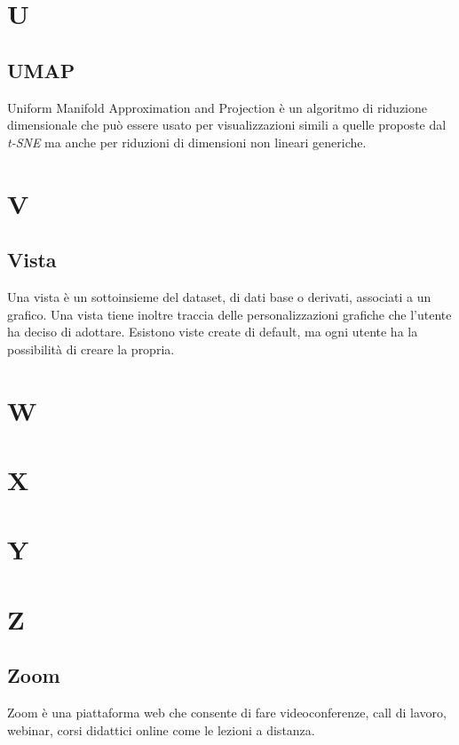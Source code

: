 \section{U}
\subsection{UMAP}
Uniform Manifold Approximation and Projection è un algoritmo di riduzione dimensionale che può essere usato per visualizzazioni simili a quelle proposte dal \textit{t-SNE} ma anche per  riduzioni di dimensioni non lineari generiche.

\newpage
\section{V}
\subsection{Vista}
Una vista è un sottoinsieme del dataset, di dati base o derivati, associati a un grafico. Una vista tiene inoltre traccia delle personalizzazioni grafiche che l'utente ha deciso di adottare. Esistono viste create di default, ma ogni utente ha la possibilità di creare la propria.

\newpage
\section{W}

\newpage
\section{X}

\newpage
\section{Y}

\newpage
\section{Z}
\subsection{Zoom}
Zoom è una piattaforma web che consente di fare videoconferenze, call di lavoro, webinar, corsi didattici online come le lezioni a distanza.